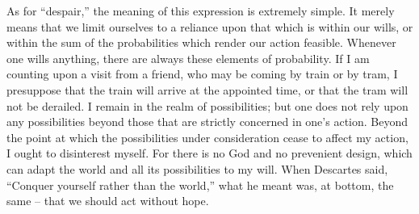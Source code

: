 \documentclass[12pt]{article}
\begin{document}
As for “despair,” the meaning of this expression is extremely simple. It merely means that we limit ourselves to a reliance upon that which is within our wills, or within the sum of the probabilities which render our action feasible. Whenever one wills anything, there are always these elements of probability. If I am counting upon a visit from a friend, who may be coming by train or by tram, I presuppose that the train will arrive at the appointed time, or that the tram will not be derailed. I remain in the realm of possibilities; but one does not rely upon any possibilities beyond those that are strictly concerned in one’s action. Beyond the point at which the possibilities under consideration cease to affect my action, I ought to disinterest myself. For there is no God and no prevenient design, which can adapt the world and all its possibilities to my will. When Descartes said, “Conquer yourself rather than the world,” what he meant was, at bottom, the same – that we should act without hope.
\end{document}
